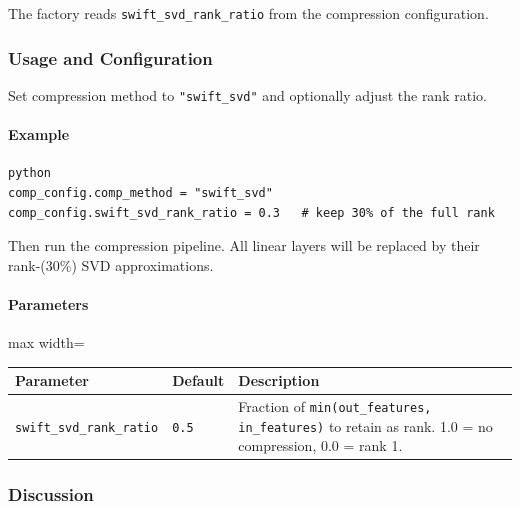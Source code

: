 The factory reads \texttt{swift\_svd\_rank\_ratio} from the compression configuration.


\subsubsection*{Usage and Configuration}

Set compression method to \texttt{"swift\_svd"} and optionally adjust the rank ratio.

\paragraph{Example}

\vspace{0.5em}
\begin{mdframed}[backgroundcolor=codebg, linecolor=codeframe, linewidth=1pt, roundcorner=4pt, innerleftmargin=2pt, innerrightmargin=5pt, innertopmargin=5pt, innerbottommargin=5pt]
\begin{lstlisting}
python
comp_config.comp_method = "swift_svd"
comp_config.swift_svd_rank_ratio = 0.3   # keep 30% of the full rank
\end{lstlisting}
\end{mdframed}
\vspace{0.5em}

Then run the compression pipeline. All linear layers will be replaced by their rank-(30\%) SVD approximations.

\paragraph{Parameters}

\begin{center}
\begin{adjustbox}{max width=\columnwidth}
\renewcommand{\arraystretch}{1.2}
\begin{tabular}{lll}
\toprule
Parameter & Default & Description \\
\midrule
\texttt{swift\_svd\_rank\_ratio} & \texttt{0.5} & Fraction of \texttt{min(out\_features, in\_features)} to retain as rank. 1.0 = no compression, 0.0 = rank 1. \\

\bottomrule
\end{tabular}
\end{adjustbox}
\end{center}

\subsubsection*{Discussion}

